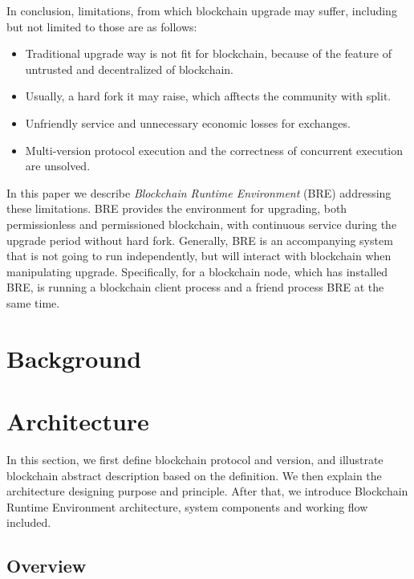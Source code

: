 \documentclass[sigplan,screen]{acmart}
\begin{document}
In conclusion, limitations, from which blockchain upgrade may suffer,
including but not limited to those are as follows:
\begin{itemize}
  \item Traditional upgrade way is not fit for blockchain, because of the
    feature of untrusted and decentralized of blockchain.
  \item Usually, a hard fork it may raise, which afftects the community with
    split.
  \item Unfriendly service and unnecessary economic losses for exchanges.
  \item Multi-version protocol execution and the correctness of concurrent
    execution are unsolved.
\end{itemize}

In this paper we describe
\textit{Blockchain Runtime Environment} (BRE) addressing these limitations.
BRE provides the environment for upgrading, both permissionless and
permissioned blockchain, with continuous service during the upgrade period
without hard fork.
Generally, BRE is an accompanying system that is not going to run
independently,  but will interact with blockchain when manipulating upgrade.
Specifically, for a blockchain node, which has installed BRE, is
running a blockchain client process and a friend process BRE at the same time.

\section{Background}

\section{Architecture}
In this section, we first define blockchain protocol and version, and illustrate
blockchain abstract description based on the definition. We then explain the
architecture designing purpose and principle. After that, we introduce Blockchain
Runtime Environment architecture, system components and working flow included.

\subsection{Overview}
\end{document}
